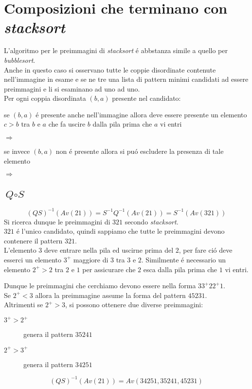 \section*{Composizioni che terminano con \textit{stacksort}}
L'algoritmo per le preimmagini di \textit{stacksort} \'e abbstanza simile a quello per \textit{bubblesort}.\\
Anche in questo caso si osservano tutte le coppie disordinate contenute nell'immagine in esame e se ne tre una lista di pattern minimi candidati ad essere preimmagini e li si esaminano ad uno ad uno.\\
Per ogni coppia disordinata $(b,a)$ presente nel candidato: 
\begin{description}
\item se $(b,a)$ \'e presente anche nell'immagine allora deve essere presente un elemento $c>b$ tra $b$ e $a$ che fa uscire $b$ dalla pila prima che $a$ vi entri
\begin{center}
 $\Longrightarrow$ 
\end{center}
\item se invece $(b,a)$ non \'e presente allora si pu\'o escludere la presenza di tale elemento
\begin{center}
 $\Longrightarrow$ 
\end{center}
\end{description}
\subsection*{$\textit{Q}\circ\textit{S}$}$$(QS)^{-1}(Av(21))=S^{-1}Q^{-1}(Av(21))=S^{-1}(Av(321))$$
Si ricerca dunque le preimmagini di $321$ secondo \textit{stacksort}.\\$321$ \'e l'unico candidato, quindi sappiamo che tutte le preimmagini devono contenere il pattern $321$.\\
L'elemento $3$ deve entrare nella pila ed uscirne prima del $2$, per fare ci\'o deve esserci un elemento $3^+$ maggiore di $3$ tra $3$ e $2$. Similmente \'e necessario un elemento $2^+>2$ tra $2$ e $1$ per assicurare che $2$ esca dalla pila prima che $1$ vi entri.\\
\begin{center}
\end{center}
Dunque le preimmagini che cerchiamo devono essere nella forma $33^+22^+1$.\\
Se $2^+<3$ allora la preimmagine assume la forma del pattern $45231$.\\
Altrimenti se $2^+>3$, si possono ottenere due diverse preimmagini:
\begin{description}
	\item[$3^+>2^+$] genera il pattern $35241$
	\item[$2^+>3^+$] genera il pattern $34251$
\end{description}
$$(QS)^{-1}(Av(21)) = Av(34251, 35241, 45231)$$
